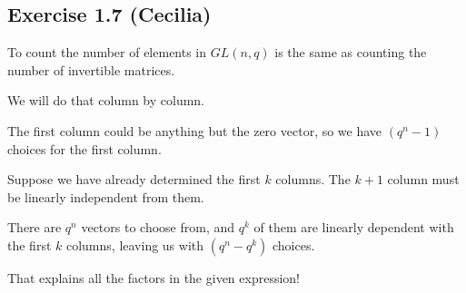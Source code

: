 \subsection*{Exercise 1.7 (Cecilia)}
To count the number of elements in $GL(n, q)$ is the same as counting the number of invertible matrices.

We will do that column by column.

The first column could be anything but the zero vector, so we have $ (q^n - 1) $ choices for the first column.

Suppose we have already determined the first $k$ columns. The $k+1$ column must be linearly independent from them.

There are $q^n$ vectors to choose from, and $q^k$ of them are linearly dependent with the first $k$ columns, leaving us with $(q^n - q^k)$ choices.

That explains all the factors in the given expression!